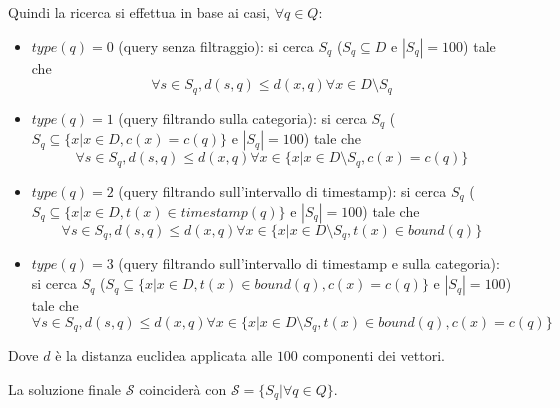 Quindi la ricerca si effettua in base ai casi, $\forall q\in Q$:
\begin{itemize}
    \item $type(q) = 0$ (query senza filtraggio): si cerca $S_q$ ($S_q \subseteq D$ 
    e $|S_q| = 100$) tale che 
    $$\forall s \in S_q, d(s, q) \le d(x, q) \forall x \in D \setminus S_q$$  
    \item $type(q) = 1$ (query filtrando sulla categoria): si cerca $S_q$ ($S_q \subseteq \{x| x\in D, c(x) = c(q)\}$ 
    e $|S_q| = 100$) tale che 
    $$\forall s \in S_q, d(s, q) \le d(x, q) \forall x \in \{x| x\in D \setminus S_q, c(x) = c(q)\}$$  
    \item $type(q) = 2$ (query filtrando sull'intervallo di timestamp): si cerca 
    $S_q$ ($S_q \subseteq \{x| x\in D, t(x) \in timestamp(q)\}$ 
    e $|S_q| = 100$) tale che 
    $$\forall s \in S_q, d(s, q) \le d(x, q) \forall x \in \{x| x\in D \setminus S_q, t(x) \in bound(q)\}$$  
    \item $type(q) = 3$ (query filtrando sull'intervallo di timestamp e sulla categoria): si cerca 
    $S_q$ ($S_q \subseteq \{x| x\in D, t(x) \in bound(q),  c(x) = c(q)\}$ 
    e $|S_q| = 100$) tale che 
    $$\forall s \in S_q, d(s, q) \le d(x, q) \forall x \in \{x| x\in D \setminus S_q, t(x) \in bound(q), c(x) = c(q)\}$$  
\end{itemize}
Dove $d$ è la distanza euclidea applicata alle $100$ componenti dei vettori.
 
La soluzione finale $\mathcal{S}$ coinciderà con $ \mathcal{S} =\{S_q| \forall q \in Q\}$.

